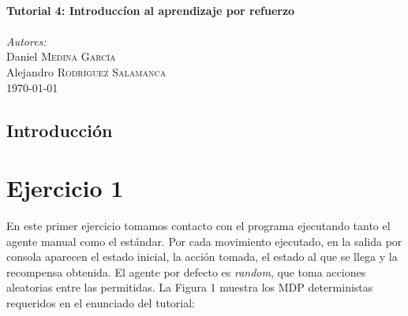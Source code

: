 \documentclass[12pt]{article}
\begin{document}
\begin{titlepage}
\HRule \\[0.7cm]
{ \huge \bfseries Tutorial 4: Introduccíon al aprendizaje por refuerzo}\\[0.4cm] %
\HRule \\[0.7cm]


\textit{Autores:}\\
Daniel \textsc{Medina García}\\ %
Alejandro \textsc{Rodríguez Salamanca}\\[1.1cm] %


{\large \today}\\ %


\vfill %

\end{titlepage}

\tableofcontents

\newpage
\thispagestyle{empty}
\clearpage
\vspace*{\fill}
\begin{center}
    \begin{minipage}{\textwidth}
        \begin{center}
            \section*{Introducción}
        \end{center}
    \end{minipage}
\end{center}
\vfill

\newpage
\section{Ejercicio 1}

En este primer ejercicio tomamos contacto con el programa ejecutando tanto el agente manual como el estándar.
Por cada movimiento ejecutado, en la salida por consola aparecen el estado inicial, la acción tomada, el estado al que se llega y la recompensa obtenida. El agente por defecto es \textit{random}, que toma acciones aleatorias entre las permitidas. La Figura 1 muestra los MDP deterministas requeridos en el enunciado del tutorial:
\end{document}

